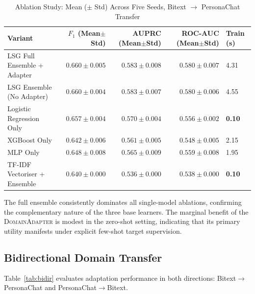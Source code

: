 \documentclass[conference]{IEEEtran}
\begin{document}
\begin{table}[t]
  \centering
  \caption{Ablation Study: Mean ($\pm$ Std) Across Five Seeds, Bitext $\to$ PersonaChat Transfer}
  \label{tab:ablation}
  \renewcommand{\arraystretch}{1.2}
  \begin{tabular}{@{}lrrrl@{}}
    \toprule
    \textbf{Variant} & \textbf{$F_1$ (Mean$\pm$Std)} & \textbf{AUPRC (Mean$\pm$Std)} & \textbf{ROC-AUC (Mean$\pm$Std)} & \textbf{Train (s)} \\
    \midrule
    LSG Full Ensemble + Adapter    & $\mathbf{0.660\pm0.005}$ & $\mathbf{0.583\pm0.008}$ & $\mathbf{0.580\pm0.007}$ & 4.31 \\
    LSG Ensemble (No Adapter)      & $0.660\pm0.004$          & $0.583\pm0.007$          & $0.580\pm0.006$          & 4.55 \\
    Logistic Regression Only       & $0.657\pm0.004$          & $0.570\pm0.004$          & $0.556\pm0.002$          & \textbf{0.10} \\
    XGBoost Only                   & $0.642\pm0.006$          & $0.561\pm0.005$          & $0.548\pm0.005$          & 2.15 \\
    MLP Only                       & $0.648\pm0.008$          & $0.565\pm0.009$          & $0.559\pm0.008$          & 1.95 \\
    TF-IDF Vectoriser + Ensemble   & $0.640\pm0.000$          & $0.536\pm0.000$          & $0.538\pm0.000$          & \textbf{0.10} \\
    \bottomrule
  \end{tabular}
\end{table}

The full ensemble consistently dominates all single-model
ablations, confirming the complementary nature of the three
base learners.
The marginal benefit of the \textsc{DomainAdapter} is modest
in the zero-shot setting, indicating that its primary utility
manifests under explicit few-shot target supervision.

\subsection{Bidirectional Domain Transfer}
Table~\ref{tab:bidir} evaluates adaptation performance
in both directions: Bitext$\to$PersonaChat and
PersonaChat$\to$Bitext.
\end{document}
